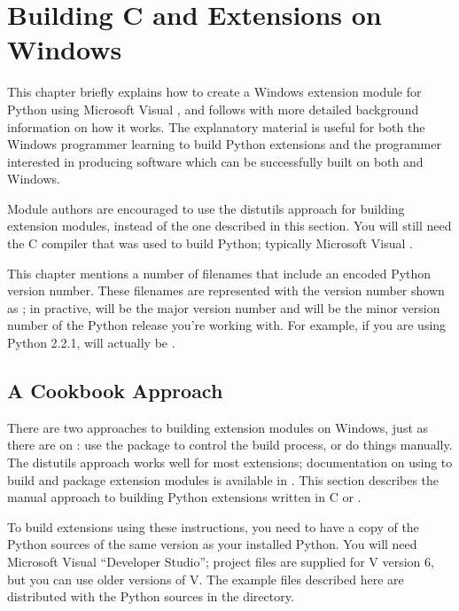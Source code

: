 \chapter{Building C and \Cpp{} Extensions on Windows
     \label{building-on-windows}}


This chapter briefly explains how to create a Windows extension module
for Python using Microsoft Visual \Cpp, and follows with more
detailed background information on how it works.  The explanatory
material is useful for both the Windows programmer learning to build
Python extensions and the \UNIX{} programmer interested in producing
software which can be successfully built on both \UNIX{} and Windows.

Module authors are encouraged to use the distutils approach for
building extension modules, instead of the one described in this
section. You will still need the C compiler that was used to build
Python; typically Microsoft Visual \Cpp.

\begin{notice}
  This chapter mentions a number of filenames that include an encoded
  Python version number.  These filenames are represented with the
  version number shown as ; in practive,  will
  be the major version number and  will be the minor
  version number of the Python release you're working with.  For
  example, if you are using Python 2.2.1,  will actually be
  .
\end{notice}


\section{A Cookbook Approach \label{win-cookbook}}

There are two approaches to building extension modules on Windows,
just as there are on \UNIX: use the  package to
control the build process, or do things manually.  The distutils
approach works well for most extensions; documentation on using
 to build and package extension modules is
available in .  This section describes the manual approach to building
Python extensions written in C or \Cpp.

To build extensions using these instructions, you need to have a copy
of the Python sources of the same version as your installed Python.
You will need Microsoft Visual \Cpp{} ``Developer Studio''; project
files are supplied for V\Cpp{} version 6, but you can use older
versions of V\Cpp.  The example files described here are distributed
with the Python sources in the  directory.

